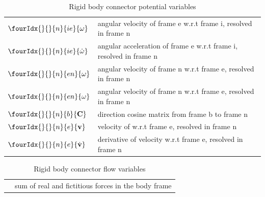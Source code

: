 \documentclass[10pt,letterpaper]{article}
\newcommand{\vect}[3]{\fourIdx{}{}{#3}{#2}{\mathbf{#1}}}
\newcommand{\vectDot}[3]{\fourIdx{}{}{#3}{#2}{\dot{\mathbf{#1}}}}
\newcommand{\wien}[0]{\vect{\omega}{ie}{n}}
\newcommand{\dwien}[0]{\vectDot{\omega}{ie}{n}}
\newcommand{\wenn}[0]{\vect{\omega}{en}{n}}
\newcommand{\ven}[0]{\vect{v}{e}{n}}
\newcommand{\dven}[0]{\vectDot{v}{e}{n}}
\newcommand{\C}[2]{\fourIdx{}{}{#1}{#2}{\mathbf{C}}}
\newcommand{\sumFb}[0]{\vect{F}{b}{}}
\begin{document}
\begin{table}[ht!]
\begin{tabular}{ll}
$\wien$ & angular velocity of frame e w.r.t frame i, resolved in frame n\\
$\dwien$ & angular acceleration of frame e w.r.t frame i, resolved in frame n\\
$\wenn$ & angular velocity of frame n w.r.t frame e, resolved in frame n \\
$\wenn$ & angular velocity of frame n w.r.t frame e, resolved in frame n\\
$\C{n}{b}$ & direction cosine matrix from frame b to frame n \\
$\ven$ & velocity of w.r.t frame e, resolved in frame n \\
$\dven$ & derivative of velocity w.r.t frame e, resolved in frame n \\
\end{tabular}
\caption{Rigid body connector potential variables}
\end{table}

\begin{table}[ht!]
\begin{tabular}{ll}
\sumFb & sum of real and fictitious forces in the body frame
\end{tabular}
\caption{Rigid body connector flow variables}
\end{table}
\end{document}
